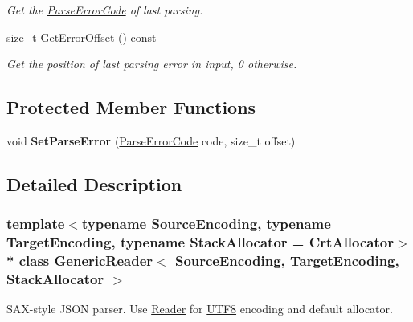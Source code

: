 \begin{DoxyCompactItemize}
\begin{DoxyCompactList}\small\item\em Get the \hyperlink{group___r_a_p_i_d_j_s_o_n___e_r_r_o_r_s_ga8d4b32dfc45840bca189ade2bbcb6ba7}{Parse\+Error\+Code} of last parsing. \end{DoxyCompactList}\item 
size\+\_\+t \hyperlink{class_generic_reader_a77399ac40cca1fb113a2d507f476b4e7}{Get\+Error\+Offset} () const \hypertarget{class_generic_reader_a77399ac40cca1fb113a2d507f476b4e7}{}\label{class_generic_reader_a77399ac40cca1fb113a2d507f476b4e7}

\begin{DoxyCompactList}\small\item\em Get the position of last parsing error in input, 0 otherwise. \end{DoxyCompactList}\end{DoxyCompactItemize}
\subsection*{Protected Member Functions}
\begin{DoxyCompactItemize}
\item 
void {\bfseries Set\+Parse\+Error} (\hyperlink{group___r_a_p_i_d_j_s_o_n___e_r_r_o_r_s_ga8d4b32dfc45840bca189ade2bbcb6ba7}{Parse\+Error\+Code} code, size\+\_\+t offset)\hypertarget{class_generic_reader_ae50079444295bf109730c3b708a818a6}{}\label{class_generic_reader_ae50079444295bf109730c3b708a818a6}

\end{DoxyCompactItemize}


\subsection{Detailed Description}
\subsubsection*{template$<$typename Source\+Encoding, typename Target\+Encoding, typename Stack\+Allocator = Crt\+Allocator$>$\\*
class Generic\+Reader$<$ Source\+Encoding, Target\+Encoding, Stack\+Allocator $>$}

S\+A\+X-\/style J\+S\+ON parser. Use \hyperlink{md_C:_Users_Bilal_Itani_Desktop_inf2990-11_Cadriciel_Commun_Externe_RapidJSON_doc_sax.zh-cn_Reader}{Reader} for \hyperlink{struct_u_t_f8}{U\+T\+F8} encoding and default allocator. 

